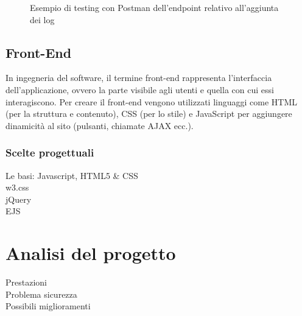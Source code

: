 \documentclass[12pt]{report}
\begin{document}
\begin{figure}
	\caption{Esempio di testing con Postman dell'endpoint relativo all'aggiunta dei log}
	\label{fig:postman_test}
\end{figure}

%
\section{Front-End}

In ingegneria del software, il termine front-end rappresenta l'interfaccia dell'applicazione, ovvero la parte visibile agli utenti e quella con cui essi interagiscono. Per creare il front-end vengono utilizzati linguaggi come HTML (per la struttura e contenuto), CSS (per lo stile) e JavaScript per aggiungere dinamicità al sito (pulsanti, chiamate AJAX ecc.).

\subsection{Scelte progettuali}
Le basi: Javascript, HTML5 \& CSS
\\
w3.css
\\
jQuery
\\
EJS
\\
%
% 
\chapter{Analisi del progetto}
\label{cap4}
Prestazioni
\\
Problema sicurezza
\\
Possibili miglioramenti
\\
%
% 
\end{document}
